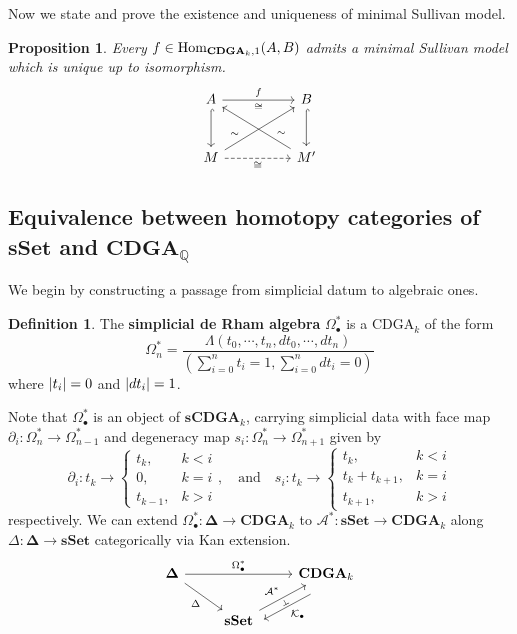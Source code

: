 \documentclass[psamsfonts]{amsart}
\newtheorem{prop}[thm]{Proposition}
\theoremstyle{definition}
\newtheorem{defn}[thm]{Definition}
\theoremstyle{remark}
\newcommand{\Q}{\mathbb{Q}}
\newcommand{\Hom}{\textup{Hom}}
\newcommand{\CDGA}{\mathbf{CDGA}}
\newcommand{\sSet}{\mathbf{sSet}}
\numberwithin{equation}{section}
\begin{document}
Now we state and prove the existence and uniqueness of minimal Sullivan model.

\begin{prop}
Every $f\in\Hom_{\CDGA_k,1}(A,B)$ admits a minimal Sullivan model which is unique up to isomorphism.
\[\begin{tikzcd}[row sep=large]
	A && B \\
	M && {M'}
	\arrow["f","\cong"', from=1-1, to=1-3]
	\arrow["\sim" near start, from=2-1, to=1-3]
	\arrow["\sim"' near start, from=2-3, to=1-1]
	\arrow["\cong"',dashed, from=2-1, to=2-3]
	\arrow[from=1-1,hookrightarrow, to=2-1]
	\arrow[from=1-3,hookrightarrow, to=2-3]
\end{tikzcd}\]
\end{prop}

\subsection{Equivalence between homotopy categories of $\sSet$ and $\CDGA_\Q$} 

We begin by constructing a passage from simplicial datum to algebraic ones.

\begin{defn}
The \textbf{simplicial de Rham algebra} $\Omega_\bullet^\ast$ is a CDGA$_k$ of the form
\[\Omega_n^\ast=\frac{\Lambda(t_0,\cdots,t_n,dt_0,\cdots,dt_n)}{\left(\sum_{i=0}^nt_i=1,\sum_{i=0}^ndt_i=0\right)}\]
where $\abs{t_i}=0$ and $\abs{dt_i}=1$.
\end{defn}

Note that $\Omega_\bullet^\ast$ is an object of $\mathbf{sCDGA}_k$, carrying simplicial data with face map $\partial_i:\Omega_n^\ast\to\Omega_{n-1}^\ast$ and degeneracy map $s_i:\Omega_n^\ast\to\Omega_{n+1}^\ast$ given by
\[\partial_i:t_k\to\begin{cases}
t_k,&k<i\\0,&k=i\\t_{k-1},&k>i
\end{cases},\quad \textrm{and}\quad s_i:t_k\to\begin{cases}
t_k,&k<i\\t_k+t_{k+1},&k=i\\t_{k+1},&k>i
\end{cases}\]
respectively. We can extend $\Omega_\bullet^\ast:\mathbf{\Delta}\to\CDGA_k$ to $\mathcal{A}^\ast:\sSet\to\CDGA_k$ along $\Delta:\mathbf{\Delta}\to\sSet$ categorically via Kan extension.
\[\begin{tikzcd}
	{\mathbf{\Delta}} && {\textbf{CDGA}_k} \\
	& {\textbf{sSet}}
	\arrow["{\Omega_\bullet^\ast}", from=1-1, to=1-3]
	\arrow["\Delta"', from=1-1, to=2-2]
	\arrow[""{name=0, anchor=center, inner sep=0}, "{\mathcal{K}_\bullet}", shift left=3, from=1-3, to=2-2]
	\arrow[""{name=1, anchor=center, inner sep=0}, "{\mathcal{A}^\ast}" from=2-2, to=1-3]
	\arrow["\dashv"{anchor=center, rotate=299}, draw=none, from=0, to=1]
\end{tikzcd}\]
\end{document}
